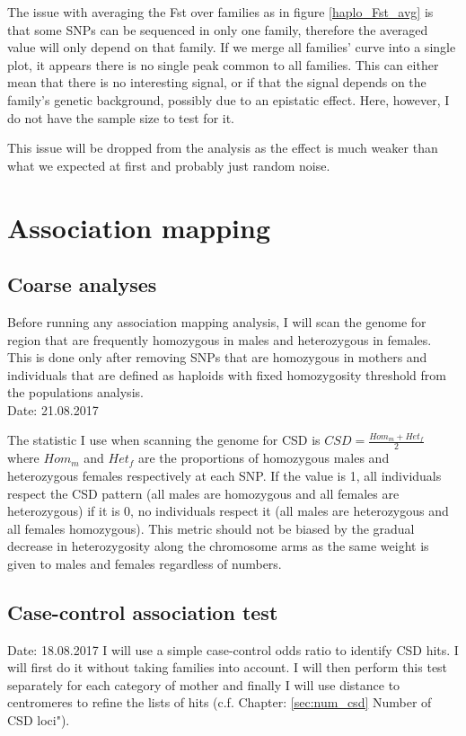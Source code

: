 \documentclass[10pt,a4paper]{report}
\begin{document}
The issue with averaging the Fst over families as in figure \ref{haplo_Fst_avg} is that some SNPs can be sequenced in only one family, therefore the averaged value will only depend on that family. If we merge all families' curve into a single plot, it appears there is no single peak common to all families. 
This can either mean that there is no interesting signal, or if that the signal depends on the family's genetic background, possibly due to an epistatic effect. Here, however, I do not have the sample size to test for it. 

This issue will be dropped from the analysis as the effect is much weaker than what we expected at first and probably just random noise.

\chapter{Association mapping}

\section{Coarse analyses}
Before running any association mapping analysis, I will scan the genome for region that are frequently homozygous in males and heterozygous in females. This is done only after removing SNPs that are homozygous in mothers and individuals that are defined as haploids with fixed homozygosity threshold from the populations analysis.\\

Date: 21.08.2017

The statistic I use when scanning the genome for CSD is $CSD=\frac{Hom_m+Het_f}{2}$ where $Hom_m$ and $Het_f$ are the proportions of homozygous males and heterozygous females respectively at each SNP. If the value is 1, all individuals respect the CSD pattern (all males are homozygous and all females are heterozygous) if it is 0, no individuals respect it (all males are heterozygous and all females homozygous). This metric should not be biased by the gradual decrease in heterozygosity along the chromosome arms as the same weight is given to males and females regardless of numbers. 

\section{Case-control association test}

Date: 18.08.2017
I will use a simple case-control odds ratio to identify CSD hits. I will first do it without taking families into account. I will then perform this test separately for each category of mother and finally I will use distance to centromeres to refine the lists of hits (c.f. Chapter: \ref{sec:num_csd} Number of CSD loci").
\end{document}
